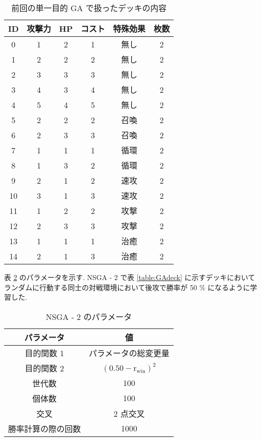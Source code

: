 \documentclass{jarticle}     %
\begin{document}
\begin{table}[h]
  \centering
  \caption{前回の単一目的 GA で扱ったデッキの内容}
  \label{table:Redeck}
  \begin{tabular}{|c|c|c|c|c|c|}
  \hline
  ID & 攻撃力 & HP & コスト & 特殊効果 & 枚数 \\ \hline
  0 & 1 & 2 & 1 & 無し & 2 \\ \hline
  1 & 2 & 2 & 2 & 無し & 2 \\ \hline
  2 & 3 & 3 & 3 & 無し & 2 \\ \hline
  3 & 4 & 3 & 4 & 無し & 2 \\ \hline
  4 & 5 & 4 & 5 & 無し & 2 \\ \hline
  5 & 2 & 2 & 2 & 召喚 & 2 \\ \hline
  6 & 2 & 3 & 3 & 召喚 & 2 \\ \hline
  7 & 1 & 1 & 1 & 循環 & 2 \\ \hline
  8 & 1 & 3 & 2 & 循環 & 2 \\ \hline
  9 & 2 & 1 & 2 & 速攻 & 2 \\ \hline
  10 & 3 & 1 & 3 & 速攻 & 2 \\ \hline
  11 & 1 & 2 & 2 & 攻撃 & 2 \\ \hline
  12 & 2 & 3 & 3 & 攻撃 & 2 \\ \hline
  13 & 1 & 1 & 1 & 治癒 & 2 \\ \hline
  14 & 2 & 1 & 3 & 治癒 & 2 \\ \hline
  \end{tabular}
  \end{table}

表 \ref{NSGA-2} のパラメータを示す. NSGA - 2 で表 \ref{table:GAdeck} に示すデッキにおいてランダムに行動する同士の対戦環境において後攻で勝率が 50 \% になるように学習した.

\begin{table}[h]
  \centering
  \caption{NSGA - 2 のパラメータ}
  \label{NSGA-2}
  \begin{tabular}{|c|c|}

  \hline
  パラメータ     & 値                         \\ \hline
  目的関数 1    & パラメータの総変更量                \\ \hline
  目的関数 2    & $(0.50 - \mathrm{r_{win}})^2$                \\ \hline
  世代数       & 100                       \\ \hline
  個体数       & 100                       \\ \hline
  交叉        & 2 点交叉                     \\ \hline
  勝率計算の際の回数 & 1000 \\ \hline
  \end{tabular}
  \end{table}
\end{document}
